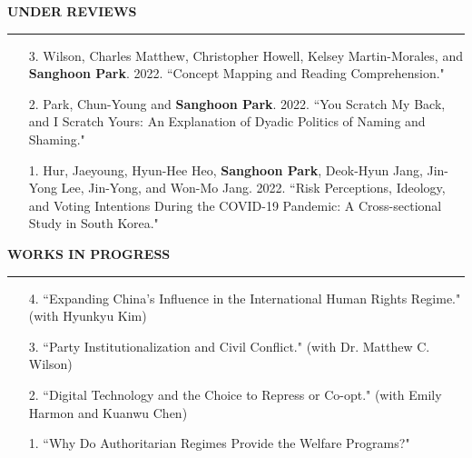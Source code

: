 \documentclass[
  16,
]{article}
\begin{document}
\vspace{7pt}

\begin{large}{\bf UNDER REVIEWS}
  \vspace{3pt}
  \hrule
\end{large}
\begin{itemize}
\item[3.] Wilson, Charles Matthew, Christopher Howell, Kelsey Martin-Morales, and \textbf{Sanghoon Park}. 2022. ``Concept Mapping and Reading Comprehension."
\item[2.] Park, Chun-Young and \textbf{Sanghoon Park}. 2022. ``You Scratch My Back, and I Scratch Yours: An Explanation of Dyadic Politics of Naming and Shaming."
\item[1.] Hur, Jaeyoung, Hyun-Hee Heo, \textbf{Sanghoon Park}, Deok-Hyun Jang, Jin-Yong Lee, Jin-Yong, and Won-Mo Jang. 2022. ``Risk Perceptions, Ideology, and Voting Intentions During the COVID-19 Pandemic: A Cross-sectional Study in South Korea."
\end{itemize}

\vspace{7pt}

\begin{large}{\bf WORKS IN PROGRESS}
  \vspace{3pt}
  \hrule
\end{large}
\begin{itemize}
    \item[4.] ``Expanding China's Influence in the International Human Rights Regime." (with Hyunkyu Kim)
    \item[3.] ``Party Institutionalization and Civil Conflict." (with Dr. Matthew C. Wilson)
    \item[2.] ``Digital Technology and the Choice to Repress or Co-opt." (with Emily Harmon and Kuanwu Chen)
    \item[1.] ``Why Do Authoritarian Regimes Provide the Welfare Programs?"
\end{itemize}
\end{document}
